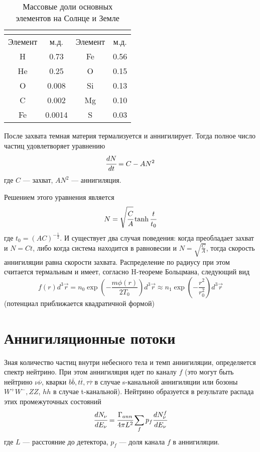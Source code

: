 \begin{table}[h!]
	\centering
	\begin{tabular}{|c|c||c|c|}
		\hline
		\multicolumn{2}{|c||}{\text{Солнце}} & \multicolumn{2}{c|}{\text{Земля}}\\
		\hline
		Элемент & м.д. & Элемент & м.д.\\ 
		\hline
		H &	0.73 & Fe & 0.56\\ 
		\hline
		He & 0.25 & O & 0.15\\
		\hline
		O &	0.008 & Si & 0.13\\
		\hline
		C &	0.002 & Mg & 0.10\\
		\hline
		Fe & 0.0014 & S & 0.03\\
		\hline
	\end{tabular}
	\label{tab:mass_fractions}
	\caption{Массовые доли основных элементов на Солнце и Земле}
\end{table}

После захвата темная материя термализуется и аннигилирует. Тогда полное число частиц удовлетворяет уравнению
\begin{equation}
	\label{eq:evolve_big}
	\cfrac{d N}{d t} = C - A N^2
\end{equation}
где $C$ --- захват, $AN^2$ --- аннигиляция.

Решением этого уравнения является
\begin{equation}
	N = \sqrt{\cfrac{C}{A}}\tanh{\cfrac{t}{t_0}}
\end{equation}
где $t_{0} = (AC)^{-\frac{1}{2}}$.
И существует два случая поведения: когда преобладает захват и $N = Ct$, либо когда система находится в равновесии и $N = \sqrt{\frac{C}{A}}$, тогда скорость аннигиляции равна скорости захвата.
Распределение по радиусу при этом считается термальным и имеет, согласно H-теореме Больцмана, следующий вид
\begin{equation}
	\label{eq:therm_dens}
	f(r) d^3\vec{r} = n_0\exp(-\frac{m\phi(r)}{2T_0})d^3\vec{r} \approx
	 n_1\exp(-\frac{r^2}{r_0^2})d^3\vec{r}
\end{equation}
(потенциал приближается квадратичной формой)



\section{Аннигиляционные потоки}

Зная количество частиц внутри небесного тела и темп аннигиляции, определяется спектр нейтрино. При этом аннигиляция идет по каналу $f$ (это могут быть нейтрино $\nu\overline{\nu}$, кварки $b\overline{b}, t\overline{t}, \tau\overline{\tau}$ в случае s-канальной аннигиляции или бозоны $W^+W^-, ZZ$, $hh$ в случае t-канальной). Нейтрино образуется в результате распада этих промежуточных состояний \cite{CIRELLI2008338}
\begin{equation}
	\cfrac{d N_{\nu}}{d E_{\nu}} = \cfrac{\Gamma_{ann}}{4\pi L^2} \sum_f{p_f \cfrac{d N^f_{\nu}}{d E_{\nu}}}
\end{equation}
где $L$ --- расстояние до детектора, $p_f$ --- доля канала $f$ в аннигиляции.

